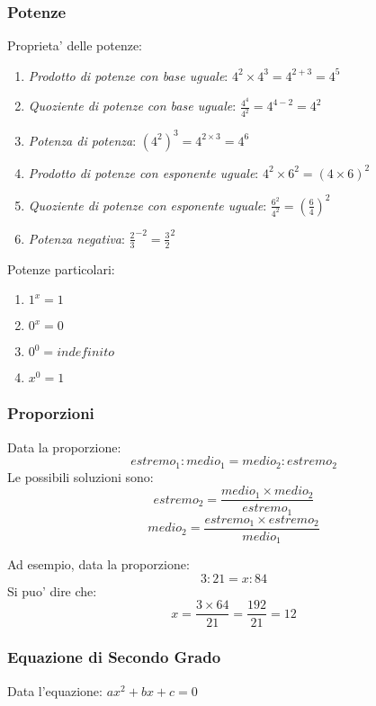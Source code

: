 \documentclass{article}
\begin{document}
{{    \subsubsection{Potenze} %
    Proprieta' delle potenze:
    \begin{enumerate}
      \item \textit{Prodotto di potenze con base uguale}: $ 4^2 \times 4^3 = 4^{2 + 3} = 4^5 $
      \item \textit{Quoziente di potenze con base uguale}: $ \frac{4^4}{4^2} = 4^{4 - 2} = 4^2 $
      \item \textit{Potenza di potenza}: $ (4^2)^3 = 4^{2 \times 3} = 4^6 $
      \item \textit{Prodotto di potenze con esponente uguale}: $ 4^2 \times 6^2 = (4 \times 6)^2 $
      \item \textit{Quoziente di potenze con esponente uguale}: $ \frac{6^2}{4^2} = (\frac{6}{4})^2 $
      \item \textit{Potenza negativa}: $ \frac{2}{3}^{-2} = \frac{3}{2}^2 $
    \end{enumerate}

    Potenze particolari:
    \begin{enumerate}
      \item $ 1^x = 1 $
      \item $ 0^x = 0 $
      \item $ 0^0 = indefinito $
      \item $ x^0 = 1 $
    \end{enumerate}

    \subsubsection{Proporzioni} %
    Data la proporzione:
    $$ estremo_1 : medio_1 = medio_2 : estremo_2 $$
    Le possibili soluzioni sono:
    $$ estremo_2 = \frac{medio_1 \times medio_2}{estremo_1}$$
    $$ medio_2 = \frac{estremo_1 \times estremo_2}{medio_1} $$

    Ad esempio, data la proporzione:
    $$ 3 : 21 = x : 84 $$
    Si puo' dire che:
    $$ x = \frac{3 \times 64}{21} = \frac{192}{21} = 12 $$

    \subsubsection{Equazione di Secondo Grado} %
    Data l'equazione: $ax^2 + bx + c = 0 $

}}
\end{document}
